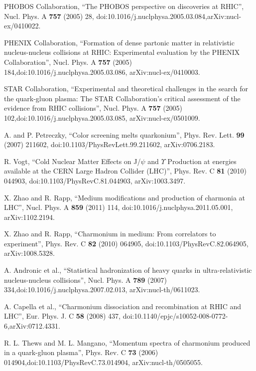 \begin{thebibliography}{999}
PHOBOS Collaboration, ``The PHOBOS perspective on discoveries at RHIC'', Nucl. Phys.
A {\bf 757} (2005) 28, doi:10.1016/j.nuclphysa.2005.03.084,arXiv:nucl-ex/0410022.

PHENIX Collaboration, ``Formation of dense partonic matter in relativistic
nucleus-nucleus collisions at RHIC: Experimental evaluation by the PHENIX Collaboration'', 
Nucl. Phys. A {\bf 757} (2005) 184,doi:10.1016/j.nuclphysa.2005.03.086, arXiv:nucl-ex/0410003.

STAR Collaboration, ``Experimental and theoretical challenges in the search for the
quark-gluon plasma: The STAR Collaboration's critical assessment of the evidence from RHIC collisions'', 
Nucl. Phys. A {\bf 757} (2005) 102,doi:10.1016/j.nuclphysa.2005.03.085, arXiv:nucl-ex/0501009.

A. and P. Petreczky, ``Color screening melts quarkonium'', Phys. Rev. Lett. {\bf 99}
(2007) 211602, doi:10.1103/PhysRevLett.99.211602, arXiv:0706.2183.

 R. Vogt, ``Cold Nuclear Matter Effects on J/$\psi$ and $\Upsilon$ Production at 
energies available at the CERN Large Hadron Collider (LHC)'', Phys. Rev. C {\bf 81} (2010) 044903,
doi:10.1103/PhysRevC.81.044903, arXiv:1003.3497.

 X. Zhao and R. Rapp, ``Medium modifications and production of charmonia at LHC'',
Nucl. Phys. A {\bf 859} (2011) 114, doi:10.1016/j.nuclphysa.2011.05.001, arXiv:1102.2194.

 X. Zhao and R. Rapp, ``Charmonium in medium: From correlators to experiment'', Phys.
Rev. C {\bf 82} (2010) 064905, doi:10.1103/PhysRevC.82.064905, arXiv:1008.5328.

A. Andronic et al., ``Statistical hadronization of heavy quarks in ultra-relativistic
nucleus-nucleus collisions'', Nucl. Phys. A {\bf 789} (2007) 334,doi:10.1016/j.nuclphysa.2007.02.013, 
arXiv:nucl-th/0611023.

A. Capella et al., ``Charmonium dissociation and recombination at RHIC and LHC'', Eur.
Phys. J. C {\bf 58} (2008) 437, doi:10.1140/epjc/s10052-008-0772-6,arXiv:0712.4331.

 R. L. Thews and M. L. Mangano, ``Momentum spectra of charmonium produced in a
quark-gluon plasma'', Phys. Rev. C {\bf 73} (2006) 014904,doi:10.1103/PhysRevC.73.014904, arXiv:nucl-th/0505055.


\end{thebibliography}
